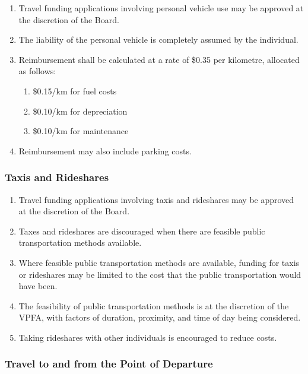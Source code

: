 \begin{enumerate}
 \item
  Travel funding applications involving personal vehicle use may be approved at the discretion of the Board.
 \item
  The liability of the personal vehicle is completely assumed by the individual.
 \item
  Reimbursement shall be calculated at a rate of \$0.35 per kilometre, allocated as follows:

  \begin{enumerate}
   \item
    \$0.15/km for fuel costs
   \item
    \$0.10/km for depreciation
   \item
    \$0.10/km for maintenance
  \end{enumerate}
 \item
  Reimbursement may also include parking costs.
\end{enumerate}

\subsubsection{Taxis and Rideshares}
\label{taxis-and-rideshares}

\begin{enumerate}
 \item
  Travel funding applications involving taxis and rideshares may be approved at the discretion of the Board.
 \item
  Taxes and rideshares are discouraged when there are feasible public transportation methods available.
 \item
  Where feasible public transportation methods are available, funding for taxis or rideshares may be limited to the cost that the public transportation would have been.
 \item
  The feasibility of public transportation methods is at the discretion of the VPFA, with factors of duration, proximity, and time of day being considered.
 \item
  Taking rideshares with other individuals is encouraged to reduce costs.
\end{enumerate}

\subsubsection{Travel to and from the Point of Departure}
\label{travel-to-and-from-the-point-of-departure}

